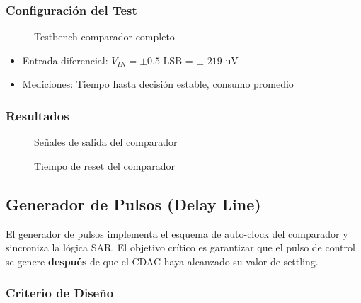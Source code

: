 \documentclass[12pt,a4paper]{report}
\begin{document}
\subsubsection{Configuración del Test}

\begin{figure}[H]
    \centering
    
    \caption{Testbench comparador completo}
        \label{comptb}
\end{figure}

\begin{itemize}
    \item Entrada diferencial: $V_{IN} = \pm 0.5$ LSB = $\pm$ $219$ uV
    \item Mediciones: Tiempo hasta decisión estable, consumo promedio
\end{itemize}

\subsubsection{Resultados}

\begin{figure}[H]
    \centering
    
    \caption{Señales de salida del comparador}
        \label{salidascomp}
\end{figure}

\begin{figure}[H]
    \centering
    
    \caption{Tiempo de reset del comparador}
        \label{rstcomp}
\end{figure}




\subsection{Generador de Pulsos (Delay Line)}

El generador de pulsos implementa el esquema de auto-clock del comparador y sincroniza la lógica SAR. El objetivo crítico es garantizar que el pulso de control se genere \textbf{después} de que el CDAC haya alcanzado su valor de settling.

\subsubsection{Criterio de Diseño}
\end{document}
